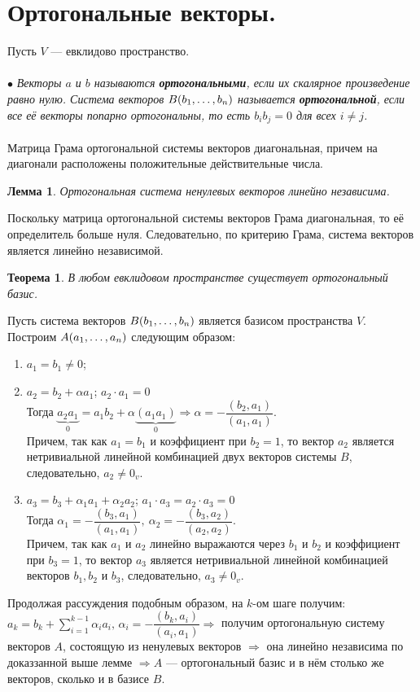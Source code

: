 \section{Ортогональные векторы.}
Пусть $V$ --- евклидово пространство.\\\\
$\bullet$ \textit{Векторы $a$ и $b$ называются \textbf{ортогональными}, если их скалярное произведение равно нулю. Система векторов $B(b_1,\dots,b_n)$ называется \textbf{ортогональной}, если все её векторы попарно ортогональны, то есть $b_ib_j = 0$ для всех $i\ne j$.}\\\\
Матрица Грама ортогональной системы векторов диагональная, причем на диагонали расположены положительные действительные числа.
\newtheorem*{lem14_2_1}{Лемма}\begin{lem14_2_1}Ортогональная система ненулевых векторов линейно независима.
\end{lem14_2_1}\begin{Proof}
	Поскольку матрица ортогональной системы векторов Грама диагональная, то её определитель больше нуля. Следовательно, по критерию Грама, система векторов является линейно независимой.
\end{Proof}
\newtheorem*{th14_2_1}{Теорема}\begin{th14_2_1}В любом евклидовом пространстве существует ортогональный базис.\end{th14_2_1}\begin{Proof}
	Пусть система векторов $B(b_1,\dots,b_n)$ является базисом пространства $V$. Построим $A(a_1,\dots,a_n)$ следующим образом:\begin{enumerate}
		\item $a_1=b_1\ne0$;
		\item $a_2=b_2+\alpha a_1$; $a_2\cdot a_1 = 0$\\
		Тогда $\underbrace{a_2 a_1}_{0} = a_1b_2 + \alpha \underbrace{(a_1a_1)}_{0}\Rightarrow \alpha = - \dfrac{(b_2, a_1)}{(a_1, a_1)}$.\\ Причем, так как $a_1 = b_1$ и коэффициент при $b_2 = 1$, то вектор $a_2$ является нетривиальной линейной комбинацией двух векторов системы $B$, следовательно, $a_2\ne 0_v$.
		\item $a_3=b_3+ \alpha_1 a_1 + \alpha_2 a_2$; $a_1\cdot a_3=a_2\cdot a_3 = 0$\\ Тогда $\alpha_1=- \dfrac{(b_3, a_1)}{(a_1, a_1)},\ \alpha_2= - \dfrac{(b_3,a_2)}{(a_2, a_2)}$.\\
		Причем, так как $a_1$ и $a_2$ линейно выражаются через $b_1$ и $b_2$ и коэффициент при $b_3 = 1$, то вектор $a_3$ является нетривиальной линейной комбинацией векторов $b_1,b_2$ и $b_3$, следовательно, $a_3\ne 0_v$.
	\end{enumerate}
	
	Продолжая рассуждения подобным образом, на $k$-ом шаге получим: $a_k=b_k + \sum\limits_{i=1}^{k-1} \alpha_i a_i, \, \alpha_i = - \dfrac{(b_k,a_i)}{(a_i,a_1)}\Rightarrow$ получим ортогональную систему векторов $A$, состоящую из ненулевых векторов $\Rightarrow$ она линейно независима по доказзанной выше лемме $\Rightarrow A$ --- ортогональный базис и в нём столько же векторов, сколько и в базисе $B$.
\end{Proof}\\\\
